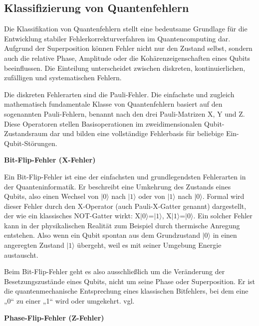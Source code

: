 \subsection{Klassifizierung von Quantenfehlern}\label{chap:QEC1.3}
Die Klassifikation von Quantenfehlern stellt eine bedeutsame Grundlage für die Entwicklung stabiler Fehlerkorrekturverfahren im Quantencomputing dar. Aufgrund der Superposition können Fehler nicht nur den Zustand selbst, sondern auch die relative Phase, Amplitude oder die Kohärenzeigenschaften eines Qubits beeinflussen. Die Einteilung unterscheidet zwischen diskreten, kontinuierlichen, zufälligen und systematischen Fehlern.

Die diskreten Fehlerarten sind die Pauli-Fehler. Die einfachste und zugleich mathematisch fundamentale Klasse von Quantenfehlern basiert auf den sogenannten Pauli-Fehlern, benannt nach den drei Pauli-Matrizen 
X, Y und Z. Diese Operatoren stellen Basisoperationen im zweidimensionalen Qubit-Zustandsraum dar und bilden eine vollständige Fehlerbasis für beliebige Ein-Qubit-Störungen.\medskip



\textbf{Bit-Flip-Fehler (X-Fehler)}

Ein Bit-Flip-Fehler ist eine der einfachsten und grundlegendsten Fehlerarten in der Quanteninformatik. Er beschreibt eine Umkehrung des Zustands eines Qubits, also einen Wechsel von $|0\rangle$ nach $|1\rangle$ oder von $|1\rangle$ nach $|0\rangle$. Formal wird dieser Fehler durch den X-Operator (auch Pauli-X-Gatter genannt) dargestellt, der wie ein klassisches NOT-Gatter wirkt: X$|0\rangle$=$|1\rangle$, X$|1\rangle$=$|0\rangle$. Ein solcher Fehler kann in der physikalischen Realität zum Beispiel durch thermische Anregung entstehen. Also wenn ein Qubit spontan aus dem Grundzustand $|0\rangle$ in einen angeregten Zustand $|1\rangle$ übergeht, weil es mit seiner Umgebung Energie austauscht.

Beim Bit-Flip-Fehler geht es also ausschließlich um die Veränderung der Besetzungszustände eines Qubits, nicht um seine Phase oder Superposition. Er ist die quantenmechanische Entsprechung eines klassischen Bitfehlers, bei dem eine „0“ zu einer „1“ wird oder umgekehrt. vgl. \cite[Seite 246-251]{rieffelQuantumComputingGentle2011a}\medskip



\textbf{Phase-Flip-Fehler (Z-Fehler)}

